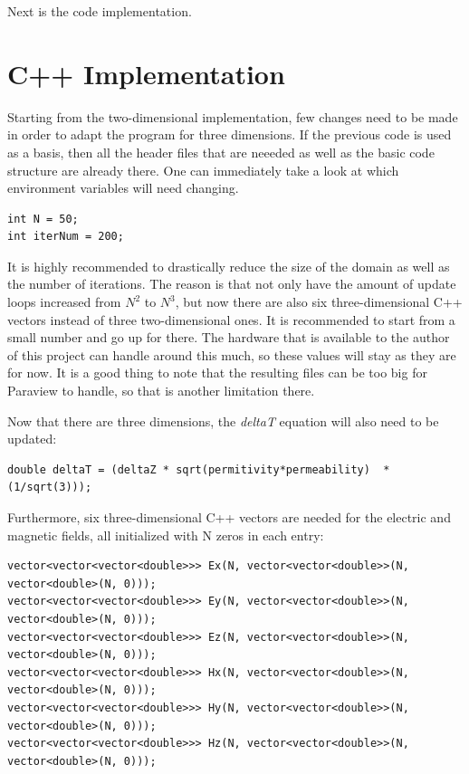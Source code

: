 Next is the code implementation.


\section{C++ Implementation}

Starting from the two-dimensional implementation, few changes need to be made in order to adapt the program for three dimensions. If the previous code is used as a basis, then all the header files that are neeeded as well as the basic code structure are already there. One can immediately take a look at which environment variables will need changing.

\begin{verbatim}
int N = 50;
int iterNum = 200;
\end{verbatim}

It is highly recommended to drastically reduce the size of the domain as well as the number of iterations. The reason is that not only have  the amount of update loops increased from $N^2$ to $N^3$, but now there are also six three-dimensional C++ vectors instead of three two-dimensional ones. It is recommended to start from a small number and go up for there. The hardware that is available to the author of this project can handle around this much, so these values will stay as they are for now. It is a good thing to note that the resulting files can be too big for Paraview to handle, so that is another limitation there.

Now that there are three dimensions, the \textit{deltaT} equation will also need to be updated:

\begin{verbatim}
double deltaT = (deltaZ * sqrt(permitivity*permeability)  * (1/sqrt(3)));
\end{verbatim}

Furthermore, six three-dimensional C++ vectors are needed for the electric and magnetic fields, all initialized with N zeros in each entry:

\begin{verbatim}
vector<vector<vector<double>>> Ex(N, vector<vector<double>>(N, vector<double>(N, 0)));
vector<vector<vector<double>>> Ey(N, vector<vector<double>>(N, vector<double>(N, 0)));
vector<vector<vector<double>>> Ez(N, vector<vector<double>>(N, vector<double>(N, 0)));
vector<vector<vector<double>>> Hx(N, vector<vector<double>>(N, vector<double>(N, 0)));
vector<vector<vector<double>>> Hy(N, vector<vector<double>>(N, vector<double>(N, 0)));
vector<vector<vector<double>>> Hz(N, vector<vector<double>>(N, vector<double>(N, 0)));
\end{verbatim}


